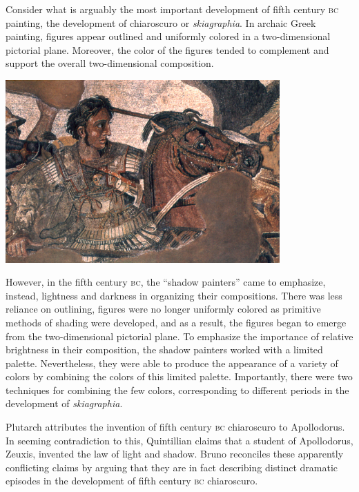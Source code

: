 Consider what is arguably the most important development of fifth century \textsc{bc} painting, the development of chiaroscuro or \emph{skiagraphia}. In archaic Greek painting, figures appear outlined and uniformly colored in a two-dimensional pictorial plane. Moreover, the color of the figures tended to complement and support the overall two-dimensional composition. \change

\begin{frame}
	\begin{center}
		\includegraphics[height=7cm]{../../graphics/alexander.jpg}
	\end{center}
\end{frame}

However, in the fifth century \textsc{bc}, the ``shadow painters'' came to emphasize, instead, lightness and darkness in organizing their compositions. There was less reliance on outlining, figures were no longer uniformly colored as primitive methods of shading were developed, and as a result, the figures began to emerge from the two-dimensional pictorial plane. To emphasize the importance of relative brightness in their composition, the shadow painters worked with a limited palette. Nevertheless, they were able to produce the appearance of a variety of colors by combining the colors of this limited palette. Importantly, there were two techniques for combining the few colors, corresponding to different periods in the development of \emph{skiagraphia}.

Plutarch attributes the invention of fifth century \textsc{bc} chiaroscuro to Apollodorus. In seeming contradiction to this, Quintillian claims that a student of Apollodorus, Zeuxis, invented the law of light and shadow. Bruno reconciles these apparently conflicting claims by arguing that they are in fact describing distinct dramatic episodes in the development of fifth century \textsc{bc} chiaroscuro.

